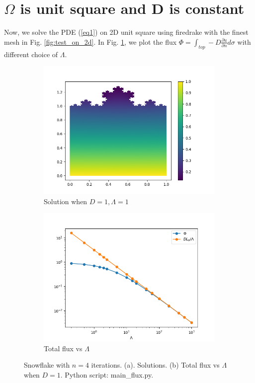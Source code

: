 \documentclass[12pt]{article}%
\theoremstyle{plain}
\numberwithin{equation}{section}
\begin{document}
\section{$\Omega$ is unit square and D is constant}
Now, we solve the PDE (\ref{eq1}) on 2D unit square using firedrake with the finest mesh in Fig. \ref{fig:test_on_2d}. In Fig. \ref{flux_square}, we plot the flux $\Phi=\int_{top}-D\frac{\partial u}{\partial n}d\sigma$ with different choice of $\Lambda$.
  \begin{figure}[H]%
    \centering
         \begin{subfigure}[h]{0.45\linewidth}
         \caption{Solution when $D=1,\Lambda=1$}
\includegraphics[width=\linewidth]{figures/Ex1/solution_D1_Lam1.png}
\end{subfigure}
 \begin{subfigure}[h]{0.45\linewidth}
         \caption{Total flux vs $\Lambda$}
\includegraphics[width=\linewidth]{figures/Ex1/Phi_Lam_n4.png}
\end{subfigure}
  \caption{Snowflake with $n=4$ iterations. (a). Solutions. (b) Total flux vs $\Lambda$ when $D=1$. Python script: main\_flux.py.}
  \label{flux_square}
 \end{figure}
\end{document}
